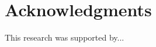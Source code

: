\documentclass{sig-alternate}
\begin{document}
\section*{Acknowledgments}

This research was supported by...




\balancecolumns
\end{document}
